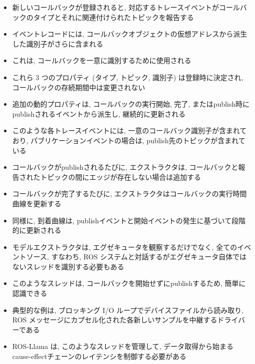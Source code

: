 \begin{frame}{}
    \begin{itemize}
        \item 新しいコールバックが登録されると, 対応するトレースイベントがコールバックのタイプとそれに関連付けられたトピックを報告する
        \item イベントレコードには, コールバックオブジェクトの仮想アドレスから派生した識別子がさらに含まれる
        \item これは, コールバックを一意に識別するために使用される
        \item これら 3 つのプロパティ (タイプ, トピック, 識別子) は登録時に決定され, コールバックの存続期間中は変更されない
    \end{itemize}
\end{frame}

\begin{frame}{}
    \begin{itemize}
        \item 追加の動的プロパティは, コールバックの実行開始, 完了, またはpublish時にpublishされるイベントから派生し, 継続的に更新される
        \item このような各トレースイベントには, 一意のコールバック識別子が含まれており, パブリケーションイベントの場合は, publish先のトピックが含まれている
        \item コールバックがpublishされるたびに, エクストラクタは, コールバックと報告されたトピックの間にエッジが存在しない場合は追加する
        \item コールバックが完了するたびに, エクストラクタはコールバックの実行時間曲線を更新する
        \item 同様に, 到着曲線は, publishイベントと開始イベントの発生に基づいて段階的に更新される
    \end{itemize}
\end{frame}

\begin{frame}{}
    \begin{itemize}
        \item モデルエクストラクタは, エグゼキュータを観察するだけでなく, 全てのイベントソース, すなわち, ROS システムと対話するがエグゼキュータ自体ではないスレッドを識別する必要もある
        \item このようなスレッドは, コールバックを開始せずにpublishするため, 簡単に認識できる
        \item 典型的な例は, ブロッキング I/O ループでデバイスファイルから読み取り, ROS メッセージにカプセル化された各新しいサンプルを中継するドライバーである
        \item ROS-Llama は, このようなスレッドを管理して, データ取得から始まるcause-effectチェーンのレイテンシを制御する必要がある
    \end{itemize}
\end{frame}

